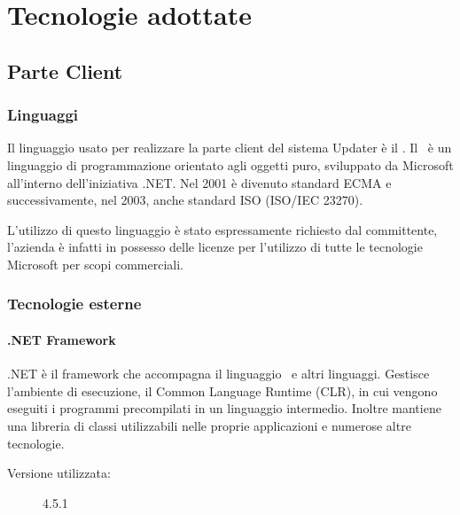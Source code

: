 \documentclass[../RelazioneFinale.tex]{subfiles}
\begin{document}
	\chapter{Tecnologie adottate}
	\label{cap:Tecnologie}
	
		\section{Parte Client}
		
			\subsection{Linguaggi}
				Il linguaggio usato per realizzare la parte client del sistema Updater è il \Csharp. Il \Csharp\ è un linguaggio di programmazione orientato agli oggetti puro, sviluppato da Microsoft all'interno dell'iniziativa .NET. 
				Nel 2001 è divenuto standard ECMA e successivamente, nel 2003, anche standard ISO (ISO/IEC 23270).
				
				L'utilizzo di questo linguaggio è stato espressamente richiesto dal committente, l'azienda è infatti in possesso delle licenze per l'utilizzo di tutte le tecnologie Microsoft per scopi commerciali.
				
			\subsection{Tecnologie esterne}			
			\subsubsection{.NET Framework}
				.NET è il framework che accompagna il linguaggio \Csharp\ e altri linguaggi. Gestisce l'ambiente di esecuzione, il Common Language Runtime (CLR), in cui vengono eseguiti i programmi precompilati in un linguaggio intermedio. Inoltre mantiene una libreria di classi utilizzabili nelle proprie applicazioni e numerose altre tecnologie.
				\begin{description}
					\item[Versione utilizzata:] 4.5.1
				\end{description}
			
\end{document}
